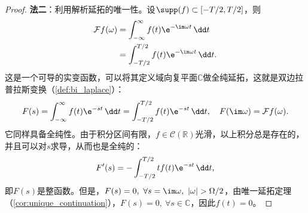\begin{proof}
    \textbf{法二}：利用解析延拓的唯一性。设$\supp(f)\subset[-T/2,T/2]$，则
    \begin{align}
        \mathcal{F} f(\omega)&=\int_{-\infty}^{\infty}f(t)\e^{-\im\omega t}\,\dd t \nonumber \\
        &=\int_{-T/2}^{T/2}f(t)\e^{-\im\omega t}\,\dd t.
    \end{align}
    这是一个可导的实变函数，可以将其定义域向复平面$\mathbb{C}$做全纯延拓，这就是双边拉普拉斯变换（\cref{def:bi_laplace}）：
    \begin{equation}
        F(s)=\int_{-\infty}^{\infty}f(t)\e^{-st}\,\dd t=\int_{-T/2}^{T/2}f(t)\e^{-st}\,\dd t,\quad F(\im\omega)=\mathcal{F} f(\omega).
    \end{equation}
    它同样具备全纯性。由于积分区间有限，$f\in\mathcal{C}(\mathbb{R})$光滑，以上积分总是存在的，并且可以对$s$求导，从而也是全纯的：
    \begin{equation}
        F'(s)=-\int_{-T/2}^{T/2}tf(t)\e^{-st}\,\dd t,
    \end{equation}
    即$F(s)$是整函数。但是，$F(s)=0,\ \forall s=\im\omega,\ |\omega|>\Omega/2$，由唯一延拓定理（\cref{cor:unique_continuation}），$F(s)=0,\ \forall s\in\mathbb{C}$，因此$f(t)=0$。
\end{proof}


